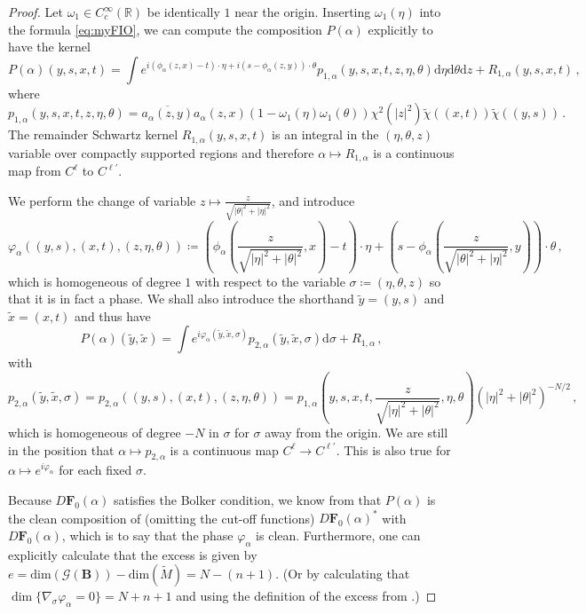 \documentclass[11pt]{amsart}
\theoremstyle{definition}
\numberwithin{equation}{section}
\newcommand{\mR}{\mathbb{R}}                    %
\newcommand{\abs}[1]{\lvert #1 \rvert}          %
\newcommand{\dd}{\mathrm{d}}
\newcommand{\BB}{\mathbf B}
\begin{document}
\begin{proof}
	Let $\omega_1 \in C_c^\infty(\mR)$ be identically $1$ near the origin. Inserting $\omega_1(\eta)$ into the formula \eqref{eq:myFIO}, we can compute the composition $P(\alpha)$ explicitly to have the kernel
	\[
		P(\alpha)(y,s,x,t) = \int e^{i(\phi_\alpha(z,x)-t)\cdot\eta+i(s-\phi_\alpha(z,y))\cdot\theta} p_{1,\alpha}(y,s,x,t,z,\eta,\theta)\dd \eta\dd\theta\dd z + R_{1,\alpha}(y,s,x,t)\,,
	\]
	where
	\[
		p_{1,\alpha}(y,s,x,t,z,\eta,\theta) = \overline{a_\alpha(z,y)}a_\alpha(z,x)(1-\omega_1(\eta)\omega_1(\theta))\chi^2(\abs{z}^2)\tilde{\chi}((x,t))\tilde{\chi}((y,s))\,.
	\]	
The remainder Schwartz kernel $R_{1,\alpha}(y,s,x,t)$ is an integral in the $(\eta, \theta, z)$ variable over compactly supported regions and therefore $\alpha \mapsto R_{1,\alpha}$ is a continuous map from $C^{\ell}$ to $C^{\ell'}$.

We perform the change of variable $z \mapsto \frac{z}{\sqrt{\abs{\theta}^2+\abs{\eta}^2}}$, and introduce
	\[
		\varphi_\alpha((y,s),(x,t),(z,\eta,\theta)) \coloneqq \left(\phi_\alpha\left(\frac{z}{\sqrt{\abs{\eta}^2+\abs{\theta}^2}},x\right)-t\right)\cdot\eta+\left(s-\phi_\alpha\left(\frac{z}{\sqrt{\abs{\theta}^2+\abs{\eta}^2}},y\right)\right)\cdot\theta\,,
	\]
	which is homogeneous of degree $1$ with respect to the variable $\sigma\coloneqq (\eta,\theta,z)$ so that it is in fact a phase. We shall also introduce the shorthand $\tilde{y} = (y,s)$ and $\tilde{x}=(x,t)$ and thus have
	\begin{equation}\label{eq:Pbeforemicrolocalize}
		P(\alpha)(\tilde{y},\tilde{x}) = \int e^{i\varphi_\alpha(\tilde{y},\tilde{x},\sigma)} p_{2,\alpha}(\tilde{y},\tilde{x},\sigma)\dd\sigma + R_{1,\alpha}\,,
	\end{equation}
	with 
	\[
			 p_{2,\alpha}(\tilde{y},\tilde{x},\sigma)= p_{2,\alpha}((y,s),(x,t),(z,\eta,\theta))=p_{1,\alpha}\left(y,s,x,t,\frac{z}{\sqrt{\abs{\eta}^2+\abs{\theta}^2}},\eta,\theta\right)(\abs{\eta}^2+\abs{\theta}^2)^{-N/2}\,,%
	\]
    which is homogeneous of degree $-N$ in $\sigma$ for $\sigma$ away from the origin. We are still in the position that $\alpha\mapsto p_{2,\alpha}$ is a continuous map $C^{\ell}\to C^{\ell'}$. This is also true for $\alpha\mapsto e^{i\varphi_\alpha}$ for each fixed $\sigma$. 

	Because $D\mathbf{F}_0(\alpha)$ satisfies the Bolker condition, we know from \cite{MR812288} that $P(\alpha)$ is the clean composition of (omitting the cut-off functions) $D\mathbf{F}_0(\alpha)^\ast$ with $D\mathbf{F}_0(\alpha)$, which is to say that the phase $\varphi_\alpha$ is clean. Furthermore, one can explicitly calculate that the excess is given by $e= \mathrm{dim}(\mathcal{G}(\BB))-\mathrm{dim}(\widetilde{M}) = N-(n+1)$. (Or by calculating that $\dim \{\nabla_\sigma \varphi_\alpha = 0\}=N+n+1$ and using the definition of the excess from \cite[Def.~21.2.15]{zbMATH05129478}.)


\end{proof}
\end{document}

